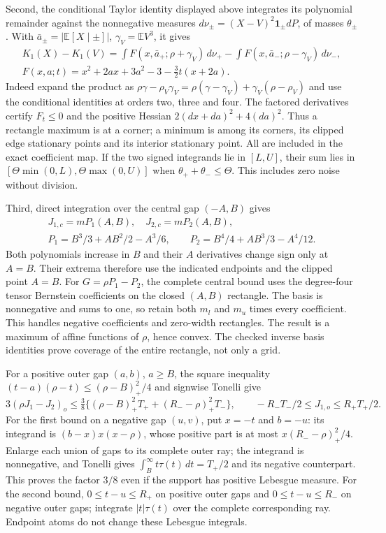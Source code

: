 \documentclass[11pt,a4paper]{article}
\newcommand{\E}{\mathbb E}
\newcommand{\ind}{\mathbf1}
\begin{document}
Second, the conditional Taylor identity
displayed above integrates its polynomial remainder
against the nonnegative measures
$d\nu_\pm=(X-V)^2\ind_\pm dP$, of masses $\theta_\pm$.
With $\bar a_\pm=|\E[X\mid\pm]|$, $\gamma_V=\E V^3$, it gives
\begin{gather*}
 K_1(X)-K_1(V)=
 \int F(x,\bar a_+;\rho+\gamma_V)\,d\nu_+
 -\int F(x,\bar a_-;\rho-\gamma_V)\,d\nu_-,\\
 F(x,a;t)=x^2+2ax+3a^2-3-\tfrac32t(x+2a).
\end{gather*}
Indeed expand the product as
$\rho\gamma-\rho_V\gamma_V=\rho(\gamma-\gamma_V)
+\gamma_V(\rho-\rho_V)$ and use the conditional identities at orders
two, three and four. The factored derivatives certify $F_t\le0$ and
the positive Hessian $2(dx+da)^2+4(da)^2$.
Thus a rectangle maximum is at a corner; a minimum is among its corners,
its clipped edge stationary points and its interior stationary point.
All are included in the exact coefficient map. If the two signed
integrands lie in $[L,U]$, their sum lies in
$[\Theta\min(0,L),\Theta\max(0,U)]$ when
$\theta_++\theta_-\le\Theta$. This includes zero noise without division.

Third, direct integration over the central gap $(-A,B)$ gives
\begin{gather*}
 J_{1,c}=mP_1(A,B),\quad J_{2,c}=mP_2(A,B),\\
 P_1=B^3/3+AB^2/2-A^3/6,\qquad
 P_2=B^4/4+AB^3/3-A^4/12.
\end{gather*}
Both polynomials increase in $B$ and their $A$ derivatives change sign
only at $A=B$. Their extrema therefore use the indicated endpoints and
the clipped point $A=B$. For $G=\rho P_1-P_2$, the complete central
bound uses the degree-four tensor Bernstein coefficients on the closed
$(A,B)$ rectangle. The basis is nonnegative and sums to one, so retain
both $m_l$ and $m_u$ times every coefficient. This handles negative
coefficients and zero-width rectangles. The result is a maximum of
affine functions of $\rho$, hence convex. The checked inverse basis
identities prove coverage of the entire rectangle, not only a grid.

For a positive outer gap $(a,b)$, $a\ge B$, the square inequality
$(t-a)(\rho-t)\le(\rho-B)_+^2/4$ and signwise Tonelli give
\[
 3(\rho J_1-J_2)_o\le\tfrac38
 \{(\rho-B)_+^2T_++(R_--\rho)_+^2T_-\},\qquad
 -R_-T_-/2\le J_{1,o}\le R_+T_+/2.
\]
For the first bound on a negative gap $(u,v)$, put $x=-t$ and $b=-u$:
its integrand is $(b-x)x(x-\rho)$, whose positive part is at most
$x(R_--\rho)_+^2/4$. Enlarge each union of gaps to its complete
outer ray; the integrand is nonnegative, and Tonelli gives
$\int_B^\infty t\tau(t)\,dt=T_+/2$ and its negative counterpart.
This proves the factor $3/8$ even if the support has positive Lebesgue
measure. For the second bound, $0\le t-u\le R_+$ on positive outer
gaps and $0\le t-u\le R_-$ on negative outer gaps; integrate
$|t|\tau(t)$ over the complete corresponding ray.
Endpoint atoms do not change these Lebesgue integrals.
\end{document}
